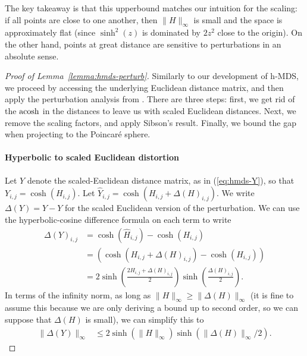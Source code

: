 The key takeaway is that this upperbound matches our intuition for the
scaling: if all points are close to one another, then $\|H\|_{\infty}$
is small and the space is approximately flat (since $\sinh^2(z)$ is
dominated by $2z^2$ close to the origin). On the other hand, points at great
distance are sensitive to perturbations in an absolute sense.

\begin{proof}[Proof of Lemma~\ref{lemma:hmds-perturb}]
Similarly to our development of h-MDS, we proceed by accessing the underlying Euclidean distance matrix, and then apply the perturbation analysis from \citet{Sibson2}. There are three steps: first, we get rid of the $\operatorname{acosh}$ in the distances to leave us with scaled Euclidean distances. Next, we remove the scaling factors, and apply Sibson's result.
Finally, we bound the gap when projecting to the Poincar{\'e} sphere.
 
\paragraph*{Hyperbolic to scaled Euclidean distortion} Let $Y$ denote the scaled-Euclidean distance matrix, as in (\ref{eq:hmds-Y}), so that $Y_{i,j} = \cosh(H_{i,j})$. Let $\hat Y_{i,j} = \cosh(H_{i,j} + \Delta(H)_{i,j})$.
We write $\Delta(Y) = \hat Y - Y$ for the scaled Euclidean version of the perturbation. We can use the hyperbolic-cosine difference formula on each term to write
\begin{align*}
  \Delta(Y)_{i,j}
  &=
  \cosh(\hat H_{i,j}) - \cosh(H_{i,j}) \\
  &=
  (\cosh(H_{i,j} + \Delta(H)_{i,j}) - \cosh(H_{i,j})) \\
  &=
  2\sinh\left( \frac{ 2 H_{i,j} + \Delta(H)_{i,j} }{2} \right) \sinh\left( \frac{ \Delta(H)_{i,j} }{2} \right).
\end{align*}
In terms of the infinity norm, as long as $\| H \|_{\infty} \ge \| \Delta(H) \|_{\infty}$ (it is fine to assume this because we are only deriving a bound up to second order, so we can suppose that $\Delta(H)$ is small), we can simplify this to
\begin{align*}
  \| \Delta(Y) \|_{\infty}
  &\le
  2\sinh\left( \| H \|_{\infty} \right) \sinh\left( \| \Delta(H) \|_{\infty} / 2 \right).
\end{align*}


\end{proof}
